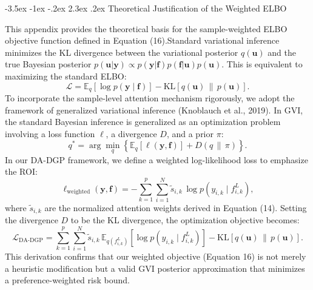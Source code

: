 \documentclass[11pt]{article}
\makeatletter
\renewcommand\section{\@startsection {section}{1}{\z@}%
	{-3.5ex \@plus -1ex \@minus -.2ex}%
	{2.3ex \@plus.2ex}%
	{\normalfont\fontfamily{phv}\fontsize{16}{19}\bfseries}}
\makeatother
\begin{document}
	
	\section{Theoretical Justification of the Weighted ELBO} \label{app:C}
	\setcounter{equation}{0}
	
	This appendix provides the theoretical basis for the sample-weighted ELBO objective function defined in Equation (16).Standard variational inference minimizes the KL divergence between the variational posterior $q(\mathbf{u})$ and the true Bayesian posterior $p(\mathbf{u}|\mathbf{y}) \propto p(\mathbf{y}|\mathbf{f})p(\mathbf{f}|\mathbf{u})p(\mathbf{u})$. This is equivalent to maximizing the standard ELBO:
	\begin{equation}
		\mathcal{L}
		= \mathbb{E}_{q}\!\left[\log p(\mathbf{y}\mid \mathbf{f})\right]
		- \mathrm{KL}\!\left[q(\mathbf{u})\,\|\,p(\mathbf{u})\right].
	\end{equation}
	To incorporate the sample-level attention mechanism rigorously, we adopt the framework of generalized variational inference (Knoblauch et al., 2019). In GVI, the standard Bayesian inference is generalized as an optimization problem involving a loss function $\ell$, a divergence $D$, and a prior $\pi$:
	\begin{equation}
		q^{\ast}
		= \arg\min_{q}\left\{\mathbb{E}_{q}\!\left[\ell(\mathbf{y},\mathbf{f})\right] + D\!\left(q\,\|\,\pi\right)\right\}.
	\end{equation}
	In our DA-DGP framework, we define a weighted log-likelihood loss to emphasize the ROI:
	\begin{equation}
		\ell_{\mathrm{weighted}}(\mathbf{y},\mathbf{f})
		= -\sum_{k=1}^{p}\sum_{i=1}^{N}\tilde{s}_{i,k}\,\log p\!\left(y_{i,k}\mid f^{L}_{i,k}\right),
	\end{equation}
	where $\tilde{s}_{i,k}$ are the normalized attention weights derived in Equation (14). Setting the divergence $D$ to be the KL divergence, the optimization objective becomes:
	\begin{equation}
		\mathcal{L}_{\mathrm{DA\text{-}DGP}}
		= \sum_{k=1}^{p}\sum_{i=1}^{N}\tilde{s}_{i,k}\,
		\mathbb{E}_{q(f^{L}_{i,k})}\!\left[\log p\!\left(y_{i,k}\mid f^{L}_{i,k}\right)\right]
		- \mathrm{KL}\!\left[q(\mathbf{u})\,\|\,p(\mathbf{u})\right].
	\end{equation}
	This derivation confirms that our weighted objective (Equation 16) is not merely a heuristic modification but a valid GVI posterior approximation that minimizes a preference-weighted risk bound.
	
\end{document}
